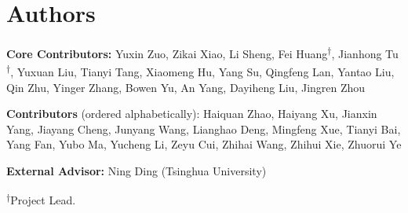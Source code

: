 \section{Authors}

\textbf{Core Contributors:} Yuxin Zuo, Zikai Xiao, Li Sheng, Fei Huang\textsuperscript{$\dagger$}, Jianhong Tu\textsuperscript{$\dagger$}, Yuxuan Liu, Tianyi Tang, Xiaomeng Hu, Yang Su, Qingfeng Lan, Yantao Liu, Qin Zhu, Yinger Zhang, Bowen Yu, An Yang, Dayiheng Liu, Jingren Zhou

\textbf{Contributors} (ordered alphabetically): Haiquan Zhao, Haiyang Xu, Jianxin Yang, Jiayang Cheng, Junyang Wang, Lianghao Deng, Mingfeng Xue, Tianyi Bai, Yang Fan, Yubo Ma, Yucheng Li, Zeyu Cui, Zhihai Wang, Zhihui Xie, Zhuorui Ye

\textbf{External Advisor:} Ning Ding (Tsinghua University)

\medskip
{\small \textsuperscript{$\dagger$}Project Lead.}
